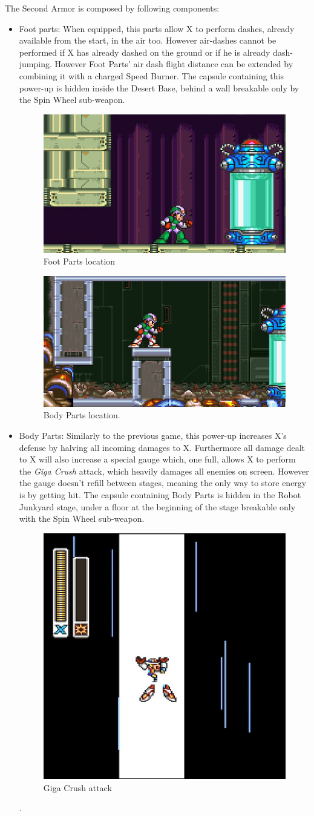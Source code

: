 The Second Armor is composed by following components:
\begin{itemize}
	\item Foot parts: When equipped, this parts allow X to perform dashes, already available from the start, in the air too. However air-dashes cannot be performed if X has already dashed on the ground or if he is already dash-jumping. However Foot Parts' air dash flight distance can be extended by combining it with a charged Speed Burner. The capsule containing this power-up is hidden inside the Desert Base, behind a wall breakable only by the Spin Wheel sub-weapon.
	\begin{figure}[htp]
		\centering
			\includegraphics[width=0.4\linewidth]{figures/X2/Overdrive_ostrich/Ostrich_capsule.jpg}	
			\caption{Foot Parts location}
	\end{figure}	


	\begin{figure}[htp]
		\centering
		\includegraphics[width=0.4\linewidth]{figures/X2/Morph_moth/Moth_capsule_2.jpg}
		\caption{Body Parts location.}
	\end{figure}
	\item Body Parts: Similarly to the previous game, this power-up increases X's defense by halving all incoming damages to X. Furthermore all damage dealt to X will also increase a special gauge which, one full, allows X to perform the \textit{Giga Crush} attack, which heavily damages all enemies on screen. 
	However the gauge doesn't refill between stages, meaning the only way to store energy is by getting hit. The capsule containing Body Parts is hidden in the Robot Junkyard stage, under a floor at the beginning of the stage breakable only with the Spin Wheel sub-weapon.
	\begin{figure}
		\centering
		\includegraphics[width=0.4\linewidth]{figures/X2/weapons/G_crush_1.png}
		\caption{Giga Crush attack}
	\end{figure}.
	

\end{itemize}
